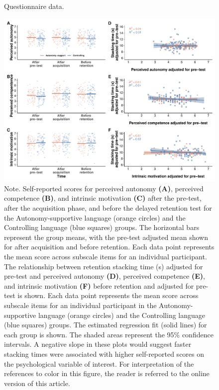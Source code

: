 \documentclass[doc,floatsintext,donotrepeattitle,letterpaper,12pt]{apa7}
\begin{document}
\begin{figure}[htbp]
    \caption{Questionnaire data.}
    \centering
    \includegraphics[scale=0.55]{../../figs/fig3.pdf}
    \setlength{\belowcaptionskip}{-2em}
    \caption*{\singlespacing \small Note. \normalfont Self-reported scores for perceived autonomy \textbf{(A)}, perceived competence \textbf{(B)}, and intrinsic motivation \textbf{(C)} after the pre-test, after the acquisition phase, and before the delayed retention test for the Autonomy-supportive language (orange circles) and the Controlling language (blue squares) groups. The horizontal bars represent the group means, with the pre-test adjusted mean shown for after acquisition and before retention. Each data point represents the mean score across subscale items for an individual participant. The relationship between retention stacking time (s) adjusted for pre-test and perceived autonomy \textbf{(D)}, perceived competence \textbf{(E)}, and intrinsic motivation \textbf{(F)} before retention and adjusted for pre-test is shown. Each data point represents the mean score across subscale items for an individual participant in the Autonomy-supportive language (orange circles) and the Controlling language (blue squares) groups. The estimated regression fit (solid lines) for each group is shown. The shaded areas represent the 95\% confidence intervals. A negative slope in these plots would suggest faster stacking times were associated with higher self-reported scores on the psychological variable of interest. For interpretation of the references to color in this figure, the reader is referred to the online version of this article.}
    \label{fig:fig3}
\end{figure}
\end{document}
